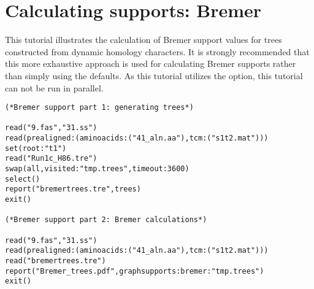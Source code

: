 


\section{Calculating supports: Bremer}{\label{tutorial4}}

This tutorial illustrates the calculation of Bremer support values for trees constructed from dynamic homology characters. 
It is strongly recommended that this more exhaustive approach is used for calculating Bremer supports rather than simply 
using the  defaults.  As this tutorial utilizes the  option, this 
tutorial can not be run in parallel.
    
\begin{verbatim}
(*Bremer support part 1: generating trees*)

read("9.fas","31.ss")
read(prealigned:(aminoacids:("41_aln.aa"),tcm:("s1t2.mat")))
set(root:"t1")
read("Run1c_H86.tre")
swap(all,visited:"tmp.trees",timeout:3600)
select()
report("bremertrees.tre",trees)
exit()

(*Bremer support part 2: Bremer calculations*)

read("9.fas","31.ss")
read(prealigned:(aminoacids:("41_aln.aa"),tcm:("s1t2.mat")))
read("bremertrees.tre")
report("Bremer_trees.pdf",graphsupports:bremer:"tmp.trees")
exit()
\end{verbatim}

